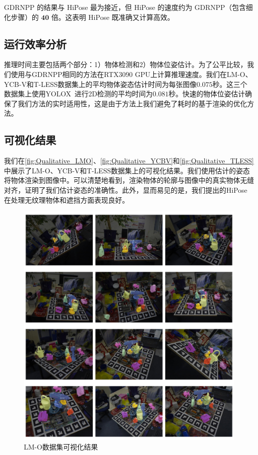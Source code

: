GDRNPP\cite{liu2022gdrnpp_bop} 的结果与 HiPose 最为接近，但 HiPose 的速度约为 GDRNPP（包含细化步骤）的 $\mathbf{40}$ 倍。这表明 HiPose 既准确又计算高效。

\subsection{运行效率分析}

推理时间主要包括两个部分：1）物体检测和2）物体位姿估计。为了公平比较，我们使用与GDRNPP相同的方法在RTX3090 GPU上计算推理速度。我们在LM-O、YCB-V和T-LESS数据集上的平均物体姿态估计时间为每张图像$0.075$秒。这三个数据集上使用YOLOX~\cite{Ge2021YOLOXEY}进行2D检测的平均时间为$0.081$秒。快速的物体位姿估计确保了我们方法的实时适用性，这是由于方法上我们避免了耗时的基于渲染的优化方法。

\subsection{可视化结果}
我们在\autoref{fig:Qualitative_LMO}、\autoref{fig:Qualitative_YCBV}和\autoref{fig:Qualitative_TLESS}中展示了LM-O\cite{Brachmann2016UncertaintyDriven6P}、YCB-V\cite{xiang2018posecnn}和T-LESS\cite{hodan2017t}数据集上的可视化结果。我们使用估计的姿态将物体渲染到图像中。可以清楚地看到，渲染物体的轮廓与图像中的真实物体无缝对齐，证明了我们估计姿态的准确性。此外，显而易见的是，我们提出的HiPose在处理无纹理物体和遮挡方面表现良好。

\begin{figure}
    \centering
    \includegraphics[width=1\linewidth]{figure/hipose/lmo_visulize.pdf}
    \caption{LM-O数据集可视化结果}
    \label{fig:Qualitative_LMO}
\end{figure}

